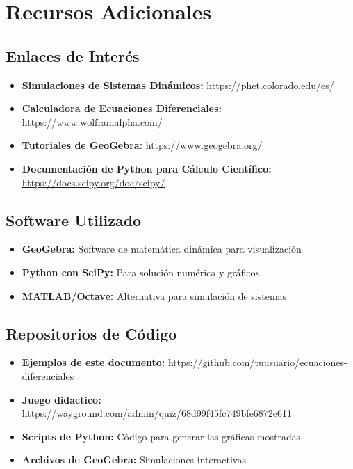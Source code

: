 \documentclass[12pt]{article}
\begin{document}
\section{Recursos Adicionales}

\subsection{Enlaces de Interés}

\begin{itemize}
    \item \textbf{Simulaciones de Sistemas Dinámicos:} 
    \url{https://phet.colorado.edu/es/}
    
    \item \textbf{Calculadora de Ecuaciones Diferenciales:} 
    \url{https://www.wolframalpha.com/}
    
    \item \textbf{Tutoriales de GeoGebra:} 
    \url{https://www.geogebra.org/}
    
    \item \textbf{Documentación de Python para Cálculo Científico:} 
    \url{https://docs.scipy.org/doc/scipy/}
\end{itemize}

\subsection{Software Utilizado}

\begin{itemize}
    \item \textbf{GeoGebra:} Software de matemática dinámica para visualización
    \item \textbf{Python con SciPy:} Para solución numérica y gráficos
    \item \textbf{MATLAB/Octave:} Alternativa para simulación de sistemas
\end{itemize}

\subsection{Repositorios de Código}

\begin{itemize}
    \item \textbf{Ejemplos de este documento:} 
    \url{https://github.com/tuusuario/ecuaciones-diferenciales}
    \item \textbf{Juego didactico:} 
    \url{https://wayground.com/admin/quiz/68d99f45fc749bfe6872e611}
    
    \item \textbf{Scripts de Python:} Código para generar las gráficas mostradas
    \item \textbf{Archivos de GeoGebra:} Simulaciones interactivas
\end{itemize}
\end{document}
